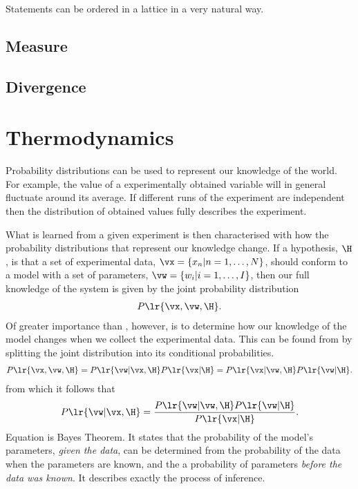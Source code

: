 {Statements can be ordered in a lattice in a very natural way.


\subsection{Measure}
\subsection{Divergence}
\section{Thermodynamics}




Probability distributions can be used to represent our knowledge of the world.
For example, the value of a  experimentally obtained variable will in general
fluctuate around its average.  
If different runs of the experiment are independent
then the  distribution of obtained values fully describes the experiment.

What is learned from a given experiment is then characterised with how the probability distributions
that represent our knowledge change.
If a hypothesis, $\H$, is that a set of experimental data, $\vx = \{x_n|n=1,\ldots,N\}$, should conform to a model with a set of parameters, $\vw = \{w_i| i=1,\ldots,I\}$,
then our full knowledge of the system is given by the joint probability distribution
\begin{align}
  P\lr{\vx,\vw,\H}.
  \label{eqn:fullJointDist}
\end{align}
Of greater importance than , however,
is to determine how our knowledge of the model changes when we collect the experimental data.
This can be found from   by splitting the joint distribution into its conditional probabilities.
\begin{align}
  P\lr{\vx,\vw,\H} = P\lr{\vw|\vx,\H}P\lr{\vx|\H}
  =  P\lr{\vx|\vw,\H} P\lr{\vw|\H}.
\end{align}
from which it follows that 
\begin{align}
   P\lr{\vw|\vx,\H} =  \frac{P\lr{\vw|\vw,\H} P\lr{\vw|\H}}{P\lr{\vx|\H}}.
  \label{eqn:BayesTheorem}
\end{align}
Equation  is Bayes Theorem.
It states that the probability of the model's parameters, {\em given the data},
can be determined from the probability of the data when the parameters are known, and the a  probability of parameters {\em before the data was known}.
It describes exactly the process of inference.

}
